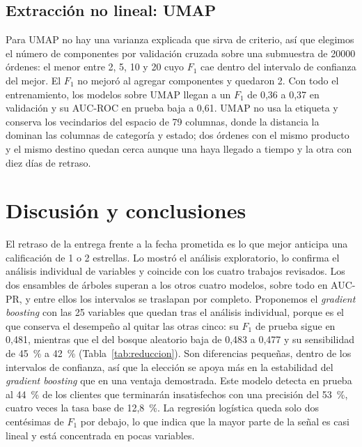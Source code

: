 \documentclass[journal]{IEEEtran}
\begin{document}
\subsection{Extracción no lineal: UMAP}

Para UMAP no hay una varianza explicada que sirva de criterio, así que elegimos el número de componentes por validación cruzada sobre una submuestra de \num{20000} órdenes: el menor entre 2, 5, 10 y 20 cuyo $F_1$ cae dentro del intervalo de confianza del mejor. El $F_1$ no mejoró al agregar componentes y quedaron 2. Con todo el entrenamiento, los modelos sobre UMAP llegan a un $F_1$ de 0,36 a 0,37 en validación y su AUC-ROC en prueba baja a 0,61. UMAP no usa la etiqueta y conserva los vecindarios del espacio de 79 columnas, donde la distancia la dominan las columnas de categoría y estado; dos órdenes con el mismo producto y el mismo destino quedan cerca aunque una haya llegado a tiempo y la otra con diez días de retraso.

\section{Discusión y conclusiones}

El retraso de la entrega frente a la fecha prometida es lo que mejor anticipa una calificación de 1 o 2 estrellas. Lo mostró el análisis exploratorio, lo confirma el análisis individual de variables y coincide con los cuatro trabajos revisados. Los dos ensambles de árboles superan a los otros cuatro modelos, sobre todo en AUC-PR, y entre ellos los intervalos se traslapan por completo. Proponemos el \emph{gradient boosting} con las 25 variables que quedan tras el análisis individual, porque es el que conserva el desempeño al quitar las otras cinco: su $F_1$ de prueba sigue en 0,481, mientras que el del bosque aleatorio baja de 0,483 a 0,477 y su sensibilidad de 45~\% a 42~\% (Tabla~\ref{tab:reduccion}). Son diferencias pequeñas, dentro de los intervalos de confianza, así que la elección se apoya más en la estabilidad del \emph{gradient boosting} que en una ventaja demostrada. Este modelo detecta en prueba al 44~\% de los clientes que terminarán insatisfechos con una precisión del 53~\%, cuatro veces la tasa base de 12,8~\%. La regresión logística queda solo dos centésimas de $F_1$ por debajo, lo que indica que la mayor parte de la señal es casi lineal y está concentrada en pocas variables.
\end{document}
